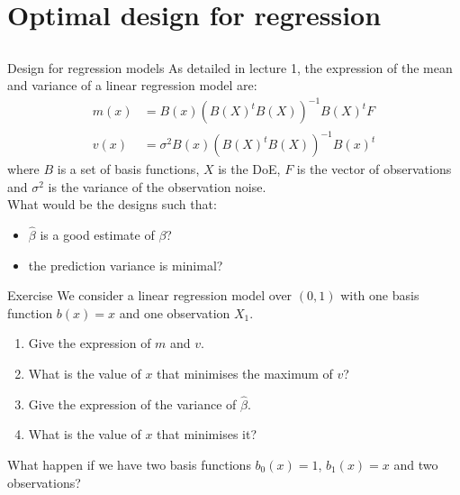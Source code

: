 \documentclass{beamer}
\begin{document}
\section[Optimal DoE for LR]{Optimal design for regression}
\subsection{}

\begin{frame}{Design for regression models}
As detailed in lecture 1, the expression of the mean and variance of a linear regression model are:
\begin{equation*}
	\begin{split}
		m(x) & = B(x) (B(X)^t B(X))^{-1} B(X)^t F\\
		v(x) & = \sigma^2 B(x) (B(X)^t B(X))^{-1} B(x)^t
	\end{split}
\end{equation*}
where $B$ is a set of basis functions, $X$ is the DoE, $F$ is the vector of observations and $\sigma^2$ is the variance of the observation noise.\\
\vspace{5mm}
What would be the designs such that:
\begin{itemize}
	\item $\hat{\beta}$ is a good estimate of $\beta$?
	\item the prediction variance is minimal?
\end{itemize}
\end{frame}

\begin{frame}{}
\begin{exampleblock}{Exercise}
	We consider a linear regression model over $(0,1)$ with one basis function $b(x)=x$ and one observation $X_1$.
	\begin{enumerate}
	 	\item Give the expression of $m$ and $v$.
	 	\item What is the value of $x$ that minimises the maximum of $v$?
	 	\item Give the expression of the variance of $\hat{\beta}$.
	 	\item What is the value of $x$ that minimises it?
	 \end{enumerate} 
	What happen if we have two basis functions $b_0(x)=1$, $b_1(x)=x$ and two observations?
\end{exampleblock}
\end{frame}
\end{document}

